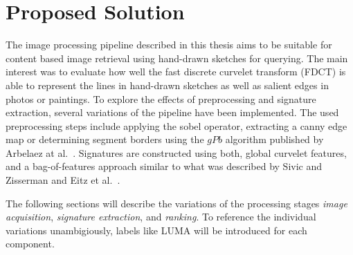 \chapter{Proposed Solution}\label{ch:solution}

The image processing pipeline described in this thesis aims to be suitable for
content based image retrieval using hand-drawn sketches for querying. The main
interest was to evaluate how well the fast discrete curvelet transform (FDCT)
\autocite{candes_fast_2006} is able to represent the lines in hand-drawn
sketches as well as salient edges in photos or paintings. To explore the
effects of preprocessing and signature extraction, several variations of the
pipeline have been implemented. The used preprocessing steps include applying
the sobel operator, extracting a canny edge map or determining segment borders
using the $gPb$ algorithm published by Arbelaez at al.\
\autocite{arbelaez_contour_2011}.  Signatures are constructed using both,
global curvelet features, and a bag-of-features approach similar to what was
described by Sivic and Zisserman \autocite{sivic_video_2003} and Eitz et al.\
\autocite{eitz_sketch-based_2010}.

The following sections will describe the variations of the processing stages
\emph{image acquisition}, \emph{signature extraction}, and \emph{ranking}. To
reference the individual variations unambigiously, labels like LUMA will
be introduced for each component.







